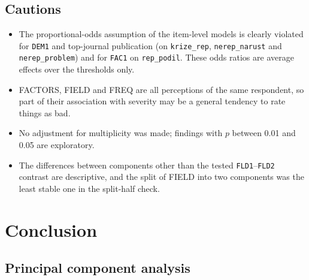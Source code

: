 \documentclass[11pt,a4paper]{article}
\newcommand{\var}[1]{\texttt{#1}}
\begin{document}
\subsection{Cautions}

\begin{itemize}
\item The proportional-odds assumption of the item-level models is clearly violated for \var{DEM1} and top-journal publication (on \var{krize\_rep}, \var{nerep\_narust} and \var{nerep\_problem}) and for \var{FAC1} on \var{rep\_podil}. These odds ratios are average effects over the thresholds only.
\item FACTORS, FIELD and FREQ are all perceptions of the same respondent, so part of their association with severity may be a general tendency to rate things as bad.
\item No adjustment for multiplicity was made; findings with $p$ between 0.01 and 0.05 are exploratory.
\item The differences between components other than the tested \var{FLD1}--\var{FLD2} contrast are descriptive, and the split of FIELD into two components was the least stable one in the split-half check.
\end{itemize}

\section{Conclusion}

\subsection{Principal component analysis}
\end{document}
